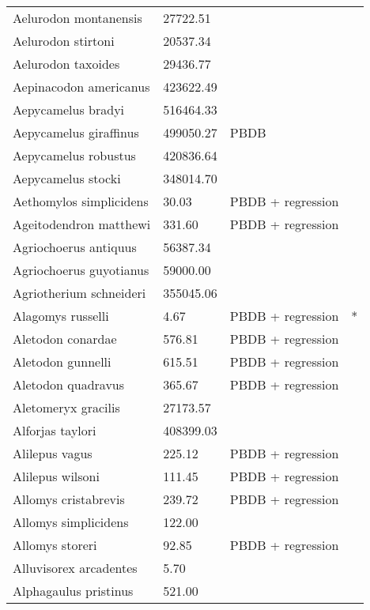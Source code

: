 \documentclass{article}
\begin{document}
\begin{center}
\begin{longtable}{p{} p{} p{} p{}}
    Aelurodon montanensis & 27722.51 & \cite{Tomiya2013} &  \\ 
    Aelurodon stirtoni & 20537.34 & \cite{Tomiya2013} &  \\ 
    Aelurodon taxoides & 29436.77 & \cite{Tomiya2013} &  \\ 
    Aepinacodon americanus & 423622.49 & \cite{Baskin2011} &  \\ 
    Aepycamelus bradyi & 516464.33 & \cite{Dawson2012} &  \\ 
    Aepycamelus giraffinus & 499050.27 & PBDB &  \\ 
    Aepycamelus robustus & 420836.64 & \cite{Tomiya2013} &  \\ 
    Aepycamelus stocki & 348014.70 & \cite{Tomiya2013} &  \\ 
    Aethomylos simplicidens & 30.03 & PBDB + regression &  \\ 
    Ageitodendron matthewi & 331.60 & PBDB + regression &  \\ 
    Agriochoerus antiquus & 56387.34 & \cite{Tomiya2013} &  \\ 
    Agriochoerus guyotianus & 59000.00 & \cite{McKenna2011} &  \\ 
    Agriotherium schneideri & 355045.06 & \cite{Tomiya2013} &  \\ 
    Alagomys russelli & 4.67 & PBDB + regression & * \\ 
    Aletodon conardae & 576.81 & PBDB + regression &  \\ 
    Aletodon gunnelli & 615.51 & PBDB + regression &  \\ 
    Aletodon quadravus & 365.67 & PBDB + regression &  \\ 
    Aletomeryx gracilis & 27173.57 & \cite{Tomiya2013} &  \\ 
    Alforjas taylori & 408399.03 & \cite{Tomiya2013} &  \\ 
    Alilepus vagus & 225.12 & PBDB + regression &  \\ 
    Alilepus wilsoni & 111.45 & PBDB + regression &  \\ 
    Allomys cristabrevis & 239.72 & PBDB + regression &  \\ 
    Allomys simplicidens & 122.00 & \cite{McKenna2011} &  \\ 
    Allomys storeri & 92.85 & PBDB + regression &  \\ 
    Alluvisorex arcadentes & 5.70 & \cite{Tomiya2013} &  \\ 
    Alphagaulus pristinus & 521.00 & \cite{McKenna2011} &  \\ 

\end{longtable}
\end{center}
\end{document}
